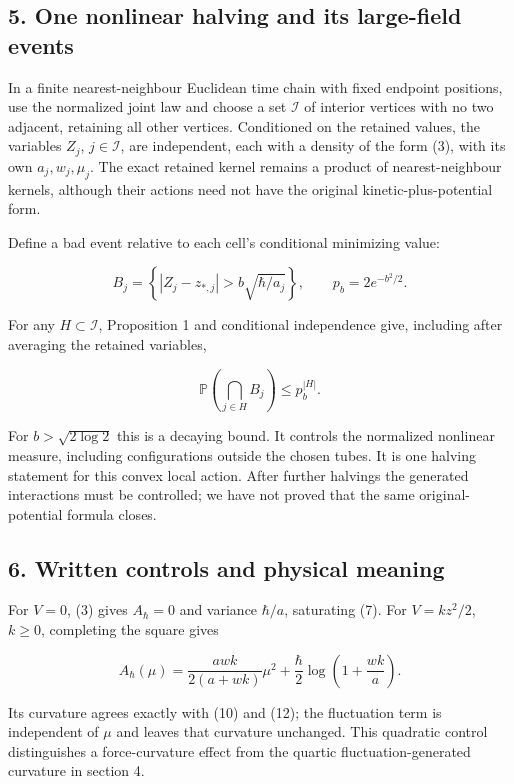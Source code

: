 \documentclass[11pt,a4paper]{article}
\begin{document}
\hypertarget{one-nonlinear-halving-and-its-large-field-events}{%
\subsection{5. One nonlinear halving and its large-field
events}\label{one-nonlinear-halving-and-its-large-field-events}}

In a finite nearest-neighbour Euclidean time chain with fixed endpoint
positions, use the normalized joint law and choose a set \(\mathcal I\)
of interior vertices with no two adjacent, retaining all other vertices.
Conditioned on the retained values, the variables \(Z_j\),
\(j\in\mathcal I\), are independent, each with a density of the form
(3), with its own \(a_j,w_j,\mu_j\). The exact retained kernel remains a
product of nearest-neighbour kernels, although their actions need not
have the original kinetic-plus-potential form.

Define a bad event relative to each cell's conditional minimizing value:

\[
 B_j=\left\{|Z_j-z_{*,j}|>b\sqrt{\hbar/a_j}\right\},\qquad
 p_b=2e^{-b^2/2}.
 \tag{20}
\]

For any \(H\subset\mathcal I\), Proposition 1 and conditional
independence give, including after averaging the retained variables,

\[\mathbb P\left(\bigcap_{j\in H}B_j\right)\le p_b^{|H|}.
 \tag{21}\]

For \(b>\sqrt{2\log2}\) this is a decaying bound. It controls the
normalized nonlinear measure, including configurations outside the
chosen tubes. It is one halving statement for this convex local action.
After further halvings the generated interactions must be controlled; we
have not proved that the same original-potential formula closes.

\hypertarget{written-controls-and-physical-meaning}{%
\subsection{6. Written controls and physical
meaning}\label{written-controls-and-physical-meaning}}

For \(V=0\), (3) gives \(A_\hbar=0\) and variance \(\hbar/a\),
saturating (7). For \(V=kz^2/2\), \(k\ge0\), completing the square gives

\[
 A_\hbar(\mu)=\frac{awk}{2(a+wk)}\mu^2
                 +\frac\hbar2\log\left(1+\frac{wk}{a}\right).
 \tag{22}
\]

Its curvature agrees exactly with (10) and (12); the fluctuation term is
independent of \(\mu\) and leaves that curvature unchanged. This
quadratic control distinguishes a force-curvature effect from the
quartic fluctuation-generated curvature in section 4.
\end{document}
